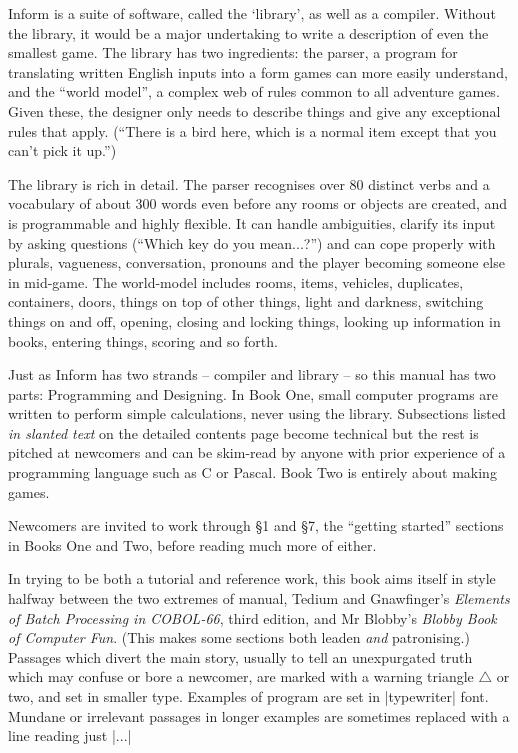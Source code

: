 Inform is a suite of software, called the `library', as well as a compiler.
Without the library, it would be a major undertaking to write a description
of even the smallest game.  The library has two ingredients: the parser, a
program for translating written English inputs into a form games can more
easily understand, and the ``world model'', a complex web of rules common
to all adventure games.  Given these, the designer only needs to describe
things and give any exceptional rules that apply.  (``There is a bird here,
which is a normal item except that you can't pick it up.'')

The library is rich in detail.  The parser recognises over 80 distinct verbs
and a vocabulary of about 300 words even before any rooms or objects are
created, and is programmable and highly flexible.  It can handle ambiguities,
clarify its input by asking questions (``Which key do you mean...?'') and can
cope properly with plurals, vagueness, conversation, pronouns and the player
becoming someone else in mid-game.  The world-model includes rooms, items,
vehicles, duplicates, containers, doors, things on top of other things, light
and darkness, switching things on and off, opening, closing and locking things,
looking up information in books, entering things, scoring and so forth.

\bigskip

Just as Inform has two strands -- compiler and library -- so this manual has
two parts: Programming and Designing.  In Book One, small computer programs
are written to perform simple calculations, never using the library.  Subsections
listed {\sl in slanted text} on the detailed contents page become technical
but the rest is pitched at newcomers and can be skim-read by anyone with
prior experience of a programming language such as C or Pascal.  Book Two
is entirely about making games.

Newcomers are invited to work through \S 1 and \S 7, the ``getting started''
sections in Books One and Two, before reading much more of either.

\bigskip
In trying to be both a tutorial and reference work, this book aims itself
in style halfway between the two extremes of manual, Tedium and Gnawfinger's
{\sl Elements of Batch Processing in COBOL-66}, third edition, and Mr Blobby's
{\sl Blobby Book of Computer Fun}.  (This makes some sections both leaden
{\sl and} patronising.)  Passages which divert the main story, usually to
tell an unexpurgated truth which may confuse or bore a newcomer, are marked
with a warning triangle $\triangle$ or two, and set in smaller type.  Examples
of program are set in |typewriter| font.  Mundane or irrelevant passages in
longer examples are sometimes replaced with a line reading just |...|

